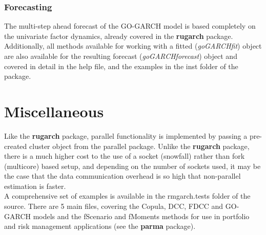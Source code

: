 \subsubsection{Forecasting}
The multi-step ahead forecast of the GO-GARCH model is based completely on the
univariate factor dynamics, already covered in the {\bf {rugarch}} package.
Additionally, all methods available for working with a fitted (\emph{goGARCHfit})
object are also available for the resulting forecast (\emph{goGARCHforecast})
object and covered in detail in the help file, and the examples in the inst
folder of the package.

\section{Miscellaneous}
Like the {\bf rugarch} package, parallel functionality is implemented by passing a
pre-created cluster object from the parallel package. Unlike the {\bf rugarch}
package, there is a much higher cost to the use of a socket (snowfall) rather than
fork (multicore) based setup, and depending on the number of sockets used, it may be
the case that the data communication overhead is so high that non-parallel estimation
is faster.\\
A comprehensive set of examples is available in the rmgarch.tests folder of the source. 
There are 5 main files, covering the Copula, DCC, FDCC and GO-GARCH models and the fScenario 
and fMoments methods for use in portfolio and risk management applications (see the {\bf parma}
package).\\
\clearpage
\appendixpage
\addappheadtotoc
